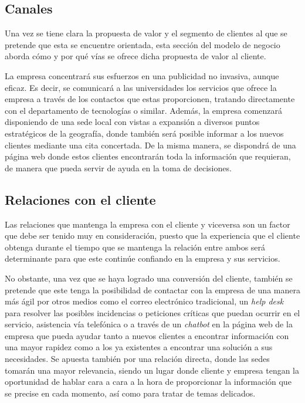 \subsection{Canales}
Una vez se tiene clara la propuesta de valor y el segmento de clientes al que se pretende que esta se encuentre orientada, esta sección del modelo de negocio aborda cómo y por qué vías se ofrece dicha propuesta de valor al cliente.

La empresa concentrará sus esfuerzos en una publicidad no invasiva, aunque eficaz. Es decir, se comunicará a las universidades los servicios que ofrece la empresa a través de los contactos que estas proporcionen, tratando directamente con el departamento de tecnologías o similar. Además, la empresa comenzará disponiendo de una sede local con vistas a expansión a diversos puntos estratégicos de la geografía, donde también será posible informar a los nuevos clientes mediante una cita concertada. De la misma manera, se dispondrá de una página web donde estos clientes encontrarán toda la información que requieran, de manera que pueda servir de ayuda en la toma de decisiones.

\subsection{Relaciones con el cliente}
Las relaciones que mantenga la empresa con el cliente y viceversa son un factor que debe ser tenido muy en consideración, puesto que la experiencia que el cliente obtenga durante el tiempo que se mantenga la relación entre ambos será determinante para que este continúe confiando en la empresa y sus servicios.

No obstante, una vez que se haya logrado una conversión del cliente, también se pretende que este tenga la posibilidad de contactar con la empresa de una manera más ágil por otros medios como el correo electrónico tradicional, un \textit{help desk} para resolver las posibles incidencias o peticiones críticas que puedan ocurrir en el servicio, asistencia vía telefónica o a través de un \textit{chatbot} en la página web de la empresa que pueda ayudar tanto a nuevos clientes a encontrar información con una mayor rapidez como a los ya existentes a encontrar una solución a sus necesidades. Se apuesta también por una relación directa, donde las sedes tomarán una mayor relevancia, siendo un lugar donde cliente y empresa tengan la oportunidad de hablar cara a cara a la hora de proporcionar la información que se precise en cada momento, así como para tratar de temas delicados.

